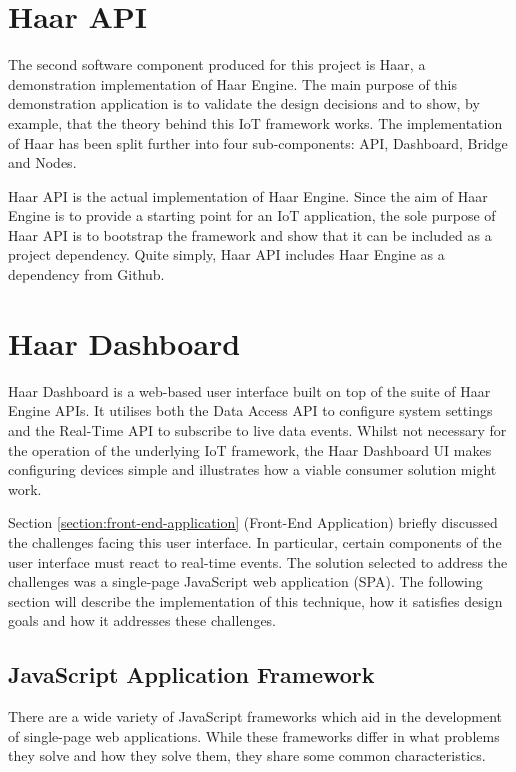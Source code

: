 
  \section{Haar API}
    The second software component produced for this project is Haar, a demonstration implementation of Haar Engine. The main purpose of this demonstration application is to validate the design decisions and to show, by example, that the theory behind this IoT framework works. The implementation of Haar has been split further into four sub-components: API, Dashboard, Bridge and Nodes.

    Haar API is the actual implementation of Haar Engine. Since the aim of Haar Engine is to provide a starting point for an IoT application, the sole purpose of Haar API is to bootstrap the framework and show that it can be included as a project dependency. Quite simply, Haar API includes Haar Engine as a dependency from Github.


  \section{Haar Dashboard}
    Haar Dashboard is a web-based user interface built on top of the suite of Haar Engine APIs. It utilises both the Data Access API to configure system settings and the Real-Time API to subscribe to live data events. Whilst not necessary for the operation of the underlying IoT framework, the Haar Dashboard UI makes configuring devices simple and illustrates how a viable consumer solution might work.

    Section \ref{section:front-end-application} (Front-End Application) briefly discussed the challenges facing this user interface. In particular, certain components of the user interface must react to real-time events. The solution selected to address the challenges was a single-page JavaScript web application (SPA). The following section will describe the implementation of this technique, how it satisfies design goals and how it addresses these challenges.

    \subsection{JavaScript Application Framework}
      There are a wide variety of JavaScript frameworks which aid in the development of single-page web applications. While these frameworks differ in what problems they solve and how they solve them, they share some common characteristics.

